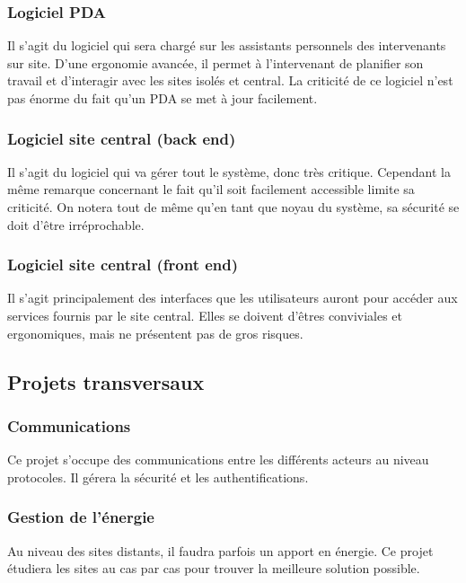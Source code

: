 \documentclass[a4paper, 11pt, draft]{report}
\begin{document}
\subsubsection{Logiciel PDA}

Il s'agit du logiciel qui sera chargé sur les assistants personnels des intervenants sur site. D'une ergonomie avancée, il permet à l'intervenant de planifier son travail et d'interagir avec les sites isolés et central. La criticité de ce logiciel n'est pas énorme du fait qu'un PDA se met à jour facilement.

\subsubsection{Logiciel site central (back end)}

Il s'agit du logiciel qui va gérer tout le système, donc très critique. Cependant la même remarque concernant le fait qu'il soit facilement accessible limite sa criticité. On notera tout de même qu'en tant que noyau du système, sa sécurité se doit d'être irréprochable.

\subsubsection{Logiciel site central (front end)}

Il s'agit principalement des interfaces que les utilisateurs auront pour accéder aux services fournis par le site central. Elles se doivent d'êtres conviviales et ergonomiques, mais ne présentent pas de gros risques.

\subsection{Projets transversaux}


\subsubsection{Communications}

Ce projet s'occupe des communications entre les différents acteurs au niveau protocoles. Il gérera la sécurité et les authentifications.

\subsubsection{Gestion de l'énergie}

Au niveau des sites distants, il faudra parfois un apport en énergie. Ce projet étudiera les sites au cas par cas pour trouver la meilleure solution possible.
\end{document}
